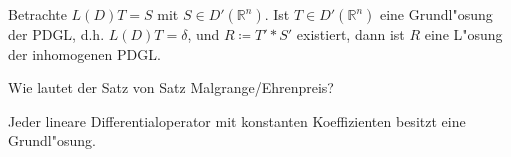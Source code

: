 \documentclass[9pt]{article}
\newcommand{\Rn}{\mathbb{R}^n}
\newenvironment{field}{}{\newpage}
\newif\ifnote
\newenvironment{note}{\notetrue}{\notefalse}
\begin{document}
\begin{note}
		\begin{field}  %
			Betrachte $L(D)T=S$ mit $S\in D'(\Rn)$. Ist $T \in D'(\Rn)$ eine Grundl"osung der PDGL, d.h. $L(D)T=\delta$, und $R\coloneqq T' * S'$ existiert, dann ist $R$ eine L"osung der inhomogenen PDGL.
		\end{field}
			
		\begin{field}  %
			Wie lautet der Satz von Satz Malgrange/Ehrenpreis?
		\end{field}
		
		\begin{field}  %
			Jeder lineare Differentialoperator mit konstanten Koeffizienten besitzt eine Grundl"osung. 
		\end{field}
		\end{note}
\end{document}
